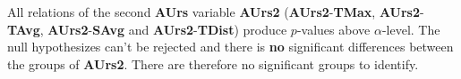 \medskip
All relations of the second \textbf{AUrs} variable \textbf{AUrs2} (\textbf{AUrs2}-\textbf{TMax}, \textbf{AUrs2}-\textbf{TAvg}, \textbf{AUrs2}-\textbf{SAvg} and \textbf{AUrs2}-\textbf{TDist}) produce $p$-values above $\alpha$-level. The null hypothesizes can't be rejected and there is \textbf{no} significant differences between the groups of \textbf{AUrs2}. There are therefore no significant groups to identify.
\medskip





